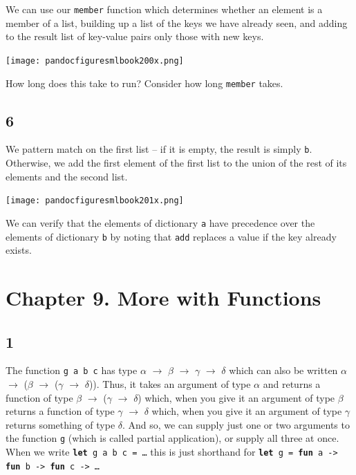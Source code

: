 \documentclass[]{book}
\begin{document}
We can use our \texttt{member} function which determines whether an element is a member of a list, building up a list of the keys we have already seen, and adding to the result list of key-value pairs only those with new keys.

\medskip
\begin{center}
\noindent\texttt{[image: pandocfiguresmlbook200x.png]}
\end{center}
\medskip

\noindent How long does this take to run? Consider how long \texttt{member} takes.

\subsection*{6}
We pattern match on the first list -- if it is empty, the result is simply \texttt{b}. Otherwise, we add the first element of the first list to the union of the rest of its elements and the second list.

\medskip
\begin{center}
\noindent\texttt{[image: pandocfiguresmlbook201x.png]}
\end{center}
\medskip

\noindent We can verify that the elements of dictionary \texttt{a} have precedence over the elements of dictionary \texttt{b} by noting that \texttt{add} replaces a value if the key already exists.

\section*{Chapter 9. More with Functions}

\subsection*{1}

The function \texttt{g\! a\! b\! c} has type $\alpha$ $\rightarrow$ $\beta$ $\rightarrow$ $\gamma$ $\rightarrow$  $\delta$ which can also be written $\alpha$ $\rightarrow$ \textmd{(}$\beta$ $\rightarrow$ \textmd{(}$\gamma$ $\rightarrow$ $\delta$\textmd{))}. Thus, it takes an argument of type $\alpha$ and returns a function of type $\beta$ $\rightarrow$ \textmd{(}$\gamma$ $\rightarrow$ $\delta$\textmd{)} which, when you give it an argument of type $\beta$ returns a function of type $\gamma$ $\rightarrow$ $\delta$ which, when you give it an argument of type $\gamma$ returns something of type $\delta$. And so, we can supply just one or two arguments to the function \texttt{g} (which is called partial application), or supply all three at once. When we write \texttt{\textbf{let}\! g\! a\! b\! c\! =\! \ldots} this is just shorthand for \texttt{\textbf{let}\! g\! =\! \textbf{fun}\! a\! ->\! \textbf{fun}\! b\! ->\! \textbf{fun}\! c\! ->\! \ldots}
\end{document}
